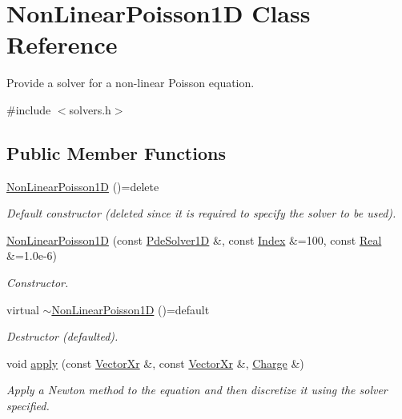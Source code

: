 \hypertarget{classNonLinearPoisson1D}{\section{Non\-Linear\-Poisson1\-D Class Reference}
\label{classNonLinearPoisson1D}
}


Provide a solver for a non-\/linear Poisson equation.  




{\ttfamily \#include $<$solvers.\-h$>$}

\subsection*{Public Member Functions}
\begin{DoxyCompactItemize}
\item 
\hypertarget{classNonLinearPoisson1D_ad4d805d47a62331707176ad2693499f3}{\hyperlink{classNonLinearPoisson1D_ad4d805d47a62331707176ad2693499f3}{Non\-Linear\-Poisson1\-D} ()=delete}\label{classNonLinearPoisson1D_ad4d805d47a62331707176ad2693499f3}

\begin{DoxyCompactList}\small\item\em Default constructor (deleted since it is required to specify the solver to be used). \end{DoxyCompactList}\item 
\hyperlink{classNonLinearPoisson1D_ac6c77988b843e0bd9df82c97b7da7cf6}{Non\-Linear\-Poisson1\-D} (const \hyperlink{classPdeSolver1D}{Pde\-Solver1\-D} \&, const \hyperlink{typedefs_8h_a2c726f8f32697958e9d6c2afecda531d}{Index} \&=100, const \hyperlink{typedefs_8h_a060b837c3b4486ee35317744156f3da2}{Real} \&=1.\-0e-\/6)
\begin{DoxyCompactList}\small\item\em Constructor. \end{DoxyCompactList}\item 
\hypertarget{classNonLinearPoisson1D_a1452123e4787361491d2f54c46794df9}{virtual \hyperlink{classNonLinearPoisson1D_a1452123e4787361491d2f54c46794df9}{$\sim$\-Non\-Linear\-Poisson1\-D} ()=default}\label{classNonLinearPoisson1D_a1452123e4787361491d2f54c46794df9}

\begin{DoxyCompactList}\small\item\em Destructor (defaulted). \end{DoxyCompactList}\item 
void \hyperlink{classNonLinearPoisson1D_a54768475940b34c5e39583a3635cf63b}{apply} (const \hyperlink{typedefs_8h_aae6cee78ed9cd8f234ed8cb48682548a}{Vector\-Xr} \&, const \hyperlink{typedefs_8h_aae6cee78ed9cd8f234ed8cb48682548a}{Vector\-Xr} \&, \hyperlink{classCharge}{Charge} \&)
\begin{DoxyCompactList}\small\item\em Apply a Newton method to the equation and then discretize it using the solver specified. \end{DoxyCompactList}\end{DoxyCompactItemize}
